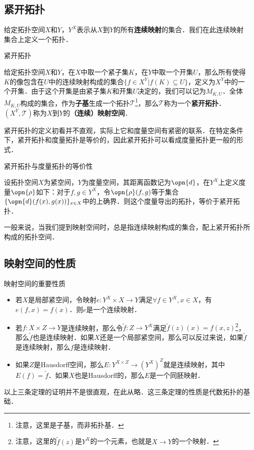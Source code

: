 
\subsection{紧开拓扑}

给定拓扑空间$X$和$Y$，$Y^X$表示从$X$到$Y$的所有\textbf{连续映射}的集合．我们在此连续映射集合上定义一个拓扑．

\begin{definition}{紧开拓扑}

给定拓扑空间$X$和$Y$，在$X$中取一个紧子集$K$，在$Y$中取一个开集$U$，那么所有使得$K$的像包含在$U$中的连续映射构成的集合$\{f\in X^Y|f(K)\subseteq U\}$，定义为$X^Y$中的一个开集．由于这个开集是由紧子集$K$和开集$U$决定的，我们可以记为$M_{K, U}$．全体$M_{K, U}$构成的集合，作为\textbf{子基}生成一个拓扑$\mathcal{T}$\footnote{注意，这里是子基，而非拓扑基．}，那么$\mathcal{T}$称为一个\textbf{紧开拓扑}．$(X^Y, \mathcal{T})$称为$X$到$Y$的\textbf{（连续）映射空间}．

\end{definition}

紧开拓扑的定义初看并不直观，实际上它和度量空间有紧密的联系．在特定条件下，紧开拓扑和度量拓扑是等价的，因此紧开拓扑可以看成度量拓扑更一般的形式．

\begin{theorem}{紧开拓扑与度量拓扑的等价性}

设拓扑空间$X$为紧空间，$Y$为度量空间，其距离函数记为$\opn{d}$，在$Y^X$上定义度量$\opn{\rho}$如下：对于$f, g\in Y^X$，令$\opn{\rho}(f, g)$等于集合$\{\opn{d}(f(x), g(x))\}_{x\in X}$中的上确界．则这个度量导出的拓扑，等价于紧开拓扑．

\end{theorem}

一般来说，当我们提到映射空间时，总是指连续映射构成的集合，配上紧开拓扑所构成的拓扑空间．

\subsection{映射空间的性质}

\begin{theorem}{映射空间的重要性质}\label{Topo8_the1}
\begin{itemize}
\item 若$X$是局部紧空间，令映射$e:Y^X\times X\rightarrow Y$满足$\forall f\in Y^X, x\in X$，有$e(f, x)=f(x)$．则$e$是一个连续映射．
\item 若$f:X\times Z\rightarrow Y$是连续映射，那么令$\tilde{f}:Z\rightarrow Y^X$满足$\tilde{f}(z)(x)=f(x, z)$\footnote{注意，这里的$\tilde{f}(z)$是$Y^X$的一个元素，也就是$X\rightarrow Y$的一个映射．}，那么$\tilde{f}$也是连续映射．如果$X$还是一个局部紧空间，那么可以反过来说，如果$\tilde{f}$是连续映射，那么$f$是连续映射．
\item 如果$Z$是Hausdorff空间，那么$E:Y^{X\times Z}\rightarrow(Y^X)^Z$就是连续映射，其中$E(f)=\tilde{f}$．如果$X$也是Hausdorff的，那么$E$是一个同胚映射．

\end{itemize}
\end{theorem}

以上三条定理的证明并不是很直观，在此从略．这三条定理的性质是代数拓扑的基础．